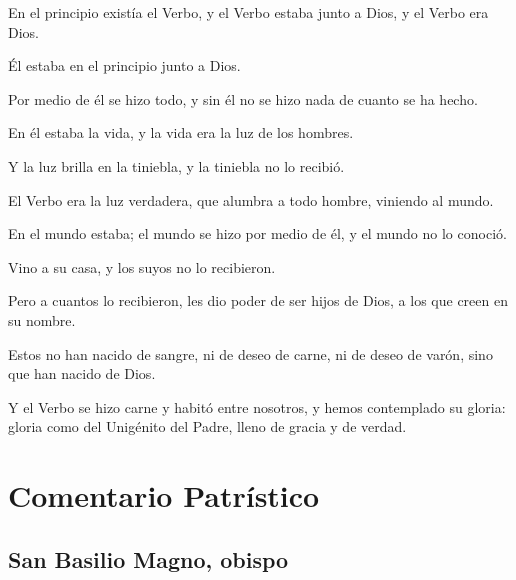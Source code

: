 		
		
		 
		
		
		\begin{scripture}
			En el principio existía el Verbo, y el Verbo estaba junto a Dios, y el Verbo era Dios.
			
			Él estaba en el principio junto a Dios.
			
			Por medio de él se hizo todo, y sin él no se hizo nada de cuanto se ha hecho.
			
			En él estaba la vida, y la vida era la luz de los hombres.
			
			Y la luz brilla en la tiniebla, y la tiniebla no lo recibió.
			
			El Verbo era la luz verdadera, que alumbra a todo hombre, viniendo al mundo.
			
			En el mundo estaba; el mundo se hizo por medio de él, y el mundo no lo conoció.
			
			Vino a su casa, y los suyos no lo recibieron.
			
			Pero a cuantos lo recibieron, les dio poder de ser hijos de Dios, a los que creen en su nombre.
			
			Estos no han nacido de sangre, ni de deseo de carne, ni de deseo de varón, sino que han nacido de Dios.
			
			Y el Verbo se hizo carne y habitó entre nosotros, y hemos contemplado su gloria: gloria como del Unigénito del Padre, lleno de gracia y de verdad.
		\end{scripture}

	\section{Comentario Patrístico}

		\subsection{San Basilio Magno, obispo}


			
